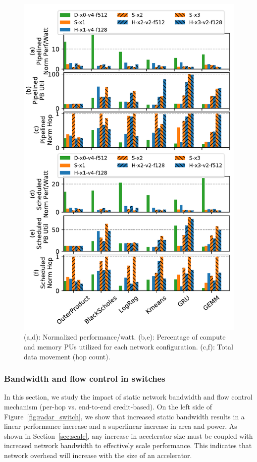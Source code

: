 \begin{figure}
\centering
  \includegraphics[width=0.8\columnwidth]{network/figs/energy.pdf} 
\caption{(a,d): Normalized performance/watt. (b,e): Percentage of compute and memory PUs utilized for each network configuration. 
  (c,f): Total data movement (hop count).}
\label{fig:energy}
\end{figure}

\subsubsection{Bandwidth and flow control in switches}

In this section, we study the impact of static network bandwidth and flow control mechanism (per-hop vs. end-to-end credit-based). 
On the left side of Figure~\ref{fig:radar_switch}, we show that increased static bandwidth results in a linear performance increase and a superlinear increase in area and power. 
As shown in Section~\ref{sec:scale}, any increase in accelerator size must be coupled with increased network bandwidth to effectively scale performance. 
This indicates that network overhead will increase with the size of an accelerator.

